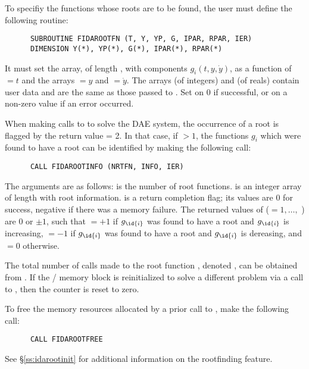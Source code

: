 To specifiy the functions whose roots are to be found, the user must
define the following routine:
\begin{verbatim}
      SUBROUTINE FIDAROOTFN (T, Y, YP, G, IPAR, RPAR, IER)
      DIMENSION Y(*), YP(*), G(*), IPAR(*), RPAR(*)
\end{verbatim}
It must set the  array, of length , with components
$g_i(t,y,\dot{y})$, as a function of  $= t$ and the arrays  $= y$
and  $= \dot{y}$.
The arrays  (of integers) and  (of reals) contain user data
and are the same as those passed to .
Set  on 0 if successful, or on a non-zero value if an error occurred.

When making calls to  to solve the DAE system, the occurrence
of a root is flagged by the return value  = 2.  In that case, if
 $> 1$, the functions $g_i$ which were found to have a root can
be identified by making the following call:
\begin{verbatim}
      CALL FIDAROOTINFO (NRTFN, INFO, IER)
\end{verbatim}
The arguments are as follows:  is the number of root functions.
 is an integer array of length  with root information.
 is a return completion flag; its values are $0$ for success, 
negative if there was a memory failure.  The returned values of 
($ = 1,\ldots,$ ) are $0$ or $\pm 1$, such that 
 $ = +1$ if $g_{\id{i}}$ was found to have a root and $g_{\id{i}}$ is increasing,
 $ = -1$ if $g_{\id{i}}$ was found to have a root and $g_{\id{i}}$ is dereasing,
and  $ = 0$ otherwise.

The total number of calls made to the root function ,
denoted , can be obtained from .
If the {\fida}/{\ida} memory block is reinitialized to solve a
different problem via a call to , then the counter
 is reset to zero.

To free the memory resources allocated by a prior call to , make
the following call:
\begin{verbatim}
      CALL FIDAROOTFREE
\end{verbatim}
See \S\ref{ss:idarootinit} for additional information on the
rootfinding feature.



